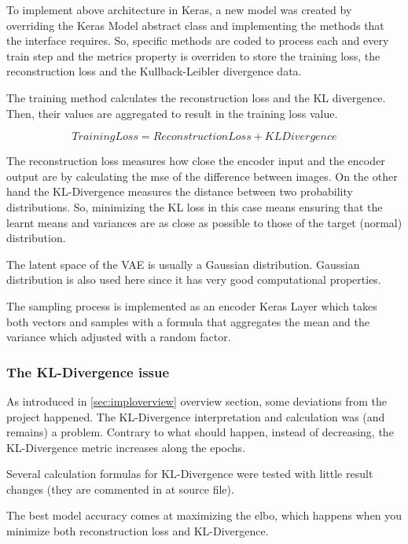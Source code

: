 To implement above architecture in Keras, a new model was created by overriding the Keras Model abstract class and implementing the methods that the interface requires. So, specific methods are coded to process each and every train step and the metrics property is overriden to store the training loss, the reconstruction loss and the Kullback-Leibler divergence data.

The training method calculates the reconstruction loss and the KL divergence. Then, their values are aggregated to result in the training loss value.

\begin{equation}
    Training Loss = Reconstruction Loss + KL Divergence
\end{equation}

The reconstruction loss measures how close the encoder input and the encoder output are by calculating the \acrshort{mse} of the difference between images. On the other hand the KL-Divergence measures the distance between two probability distributions. So, minimizing the KL loss in this case means ensuring that the learnt means and variances are as close as possible to those of the target (normal) distribution.

The latent space of the VAE is usually a Gaussian distribution. Gaussian distribution is also used here since it has very good computational properties. 

The sampling process is implemented as an encoder Keras Layer which takes both vectors and samples with a formula that aggregates the mean and the variance which adjusted with a random factor.


\subsubsection*{The KL-Divergence issue}

As introduced in \ref*{sec:imploverview} overview section, some deviations from the project happened. The KL-Divergence interpretation and calculation was (and remains) a problem. Contrary to what should happen, instead of decreasing, the KL-Divergence metric increases along the epochs. 

Several calculation formulas for KL-Divergence were tested with little result changes (they are commented in at source file). 

The best model accuracy comes at maximizing the \acrfull*{elbo}, which happens when you minimize both reconstruction loss and KL-Divergence.

